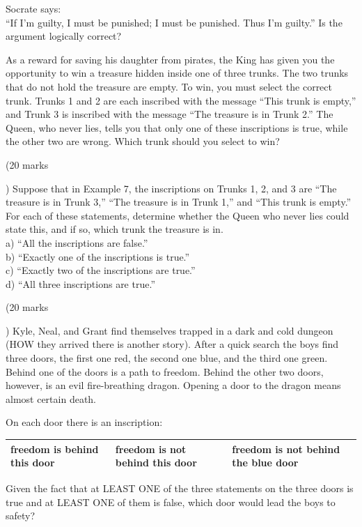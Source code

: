 \begin{example}
  Socrate says:\\
“If I’m guilty, I must be punished;
I must be punished. Thus I’m guilty.”
Is the argument logically correct?
\end{example}
\vspace{2in}

\begin{example}
As a reward for saving his daughter from pirates, the King has given you the opportunity to win
a treasure hidden inside one of three trunks. The two trunks that do not hold the treasure are
empty. To win, you must select the correct trunk. Trunks 1 and 2 are each inscribed with the
message “This trunk is empty,” and Trunk 3 is inscribed with the message “The treasure is in
Trunk 2.” The Queen, who never lies, tells you that only one of these inscriptions is true, while
the other two are wrong. Which trunk should you select to win?
\end{example}
\vspace{2in}

\begin{problem}(20 marks\addtocounter{marks}{20})
Suppose that in Example 7, the inscriptions on Trunks 1,
2, and 3 are “The treasure is in Trunk 3,” “The treasure is
in Trunk 1,” and “This trunk is empty.” For each of these
statements, determine whether the Queen who never
lies could state this, and if so, which trunk the treasure
is in.\\
a) “All the inscriptions are false.”\\
b) “Exactly one of the inscriptions is true.”\\
c) “Exactly two of the inscriptions are true.”\\
d) “All three inscriptions are true.”\\
\end{problem}
\begin{problem}(20 marks\addtocounter{marks}{20})
Kyle, Neal, and Grant find themselves trapped in a dark and cold dungeon
(HOW they arrived there is another story). After a quick search the boys find
three doors, the first one red, the second one blue, and the third one green.
Behind one of the doors is a path to freedom. Behind the other two doors,
however, is an evil fire-breathing dragon. Opening a door to the dragon means
almost certain death.

On each door there is an inscription:
\bgroup
\def\arraystretch{1.5}
\begin{tabular}{|p{0.5in}|p{0.5in}|p{0.5in}|}
  \hline
  \cellcolor{red!25}freedom is behind this door
 & \cellcolor{blue!25}freedom is not behind this door
 & \cellcolor{green!25}freedom is not behind the blue door\\
  \hline
\end{tabular}
\egroup

Given the fact that at LEAST ONE of the three statements on the three doors
is true and at LEAST ONE of them is false, which door would lead the boys to
safety?
\end{problem}


